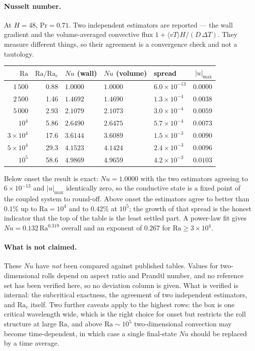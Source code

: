 \documentclass[11pt,a4paper]{article}
\newcommand{\e}[1]{\times 10^{#1}}
\begin{document}
\paragraph{Nusselt number.} At $H=48$, $\mathrm{Pr}=0.71$. Two independent
estimators are reported --- the wall gradient and the volume-averaged convective
flux $1+\langle vT\rangle H/(D\,\Delta T)$. They measure different things, so
their agreement is a convergence check and not a tautology.
\begin{center}\small
\begin{tabular}{rrlllr}
\toprule
$\mathrm{Ra}$ & $\mathrm{Ra}/\mathrm{Ra}_c$ & $Nu$ (wall) & $Nu$ (volume) & spread & $|u|_{\max}$ \\
\midrule
$1\,500$   & 0.88 & $1.0000$ & $1.0000$ & $6.0\e{-13}$ & $0.0000$ \\
$2\,500$   & 1.46 & $1.4692$ & $1.4690$ & $1.3\e{-4}$  & $0.0038$ \\
$5\,000$   & 2.93 & $2.1079$ & $2.1073$ & $3.0\e{-4}$  & $0.0059$ \\
$10^{4}$   & 5.86 & $2.6490$ & $2.6475$ & $5.7\e{-4}$  & $0.0073$ \\
$3\times10^{4}$ & 17.6 & $3.6144$ & $3.6089$ & $1.5\e{-3}$ & $0.0090$ \\
$5\times10^{4}$ & 29.3 & $4.1523$ & $4.1424$ & $2.4\e{-3}$ & $0.0096$ \\
$10^{5}$   & 58.6 & $4.9869$ & $4.9659$ & $4.2\e{-3}$  & $0.0103$ \\
\bottomrule
\end{tabular}
\end{center}
\noindent Below onset the result is exact: $Nu = 1.0000$ with the two estimators
agreeing to $6\e{-13}$ and $|u|_{\max}$ identically zero, so the conductive state
is a fixed point of the coupled system to round-off. Above onset the estimators
agree to better than $0.1\%$ up to $\mathrm{Ra}=10^4$ and to $0.42\%$ at
$10^5$; the growth of that spread is the honest indicator that the top of the
table is the least settled part. A power-law fit gives
$Nu = 0.132\,\mathrm{Ra}^{0.319}$ overall and an exponent of $0.267$ for
$\mathrm{Ra}\ge3\times10^4$.

\paragraph{What is not claimed.} These $Nu$ have \emph{not} been compared against
published tables. Values for two-dimensional rolls depend on aspect ratio and
Prandtl number, and no reference set has been verified here, so no deviation
column is given. What is verified is internal: the subcritical exactness, the
agreement of two independent estimators, and $\mathrm{Ra}_c$ itself. Two further
caveats apply to the highest rows: the box is one critical wavelength wide, which
is the right choice for onset but restricts the roll structure at large
$\mathrm{Ra}$, and above $\mathrm{Ra}\sim10^5$ two-dimensional convection may
become time-dependent, in which case a single final-state $Nu$ should be replaced
by a time average.
\end{document}
